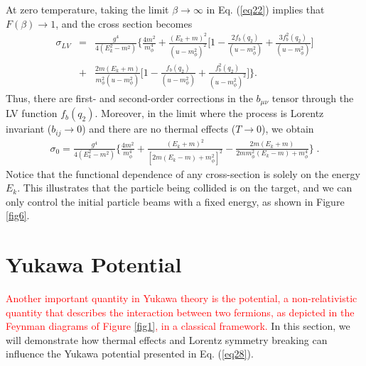 \documentclass[11pt,showpacs,preprintnumbers,amsmath,amssymb,prd,nofootinbib,superscriptaddress]{revtex4-2}
\begin{document}
At zero temperature, taking the limit $\beta \to \infty$ in Eq. (\ref{eq22}) implies that $F(\beta) \to 1$, and the cross section becomes
\begin{eqnarray}
\sigma_{LV}&=&\frac{g^4}{4(E_k^2-m^2)}\bigg\{\frac{4m^2}{m_\phi^4}+\frac{(E_k+m)^2}{(u-m_\phi^2)^2}\bigg[1-\frac{2f_b(q_2)}{(u-m_\phi^2)}+\frac{3f_b^2(q_2)}{(u-m_\phi^2)}\bigg]\nonumber\\
    &+&\frac{2m(E_k+m)}{m_{\phi}^2(u-m_\phi^2)}\bigg[1-\frac{f_b(q_2)}{(u-m_\phi^2)}+\frac{f^2_b(q_2)}{(u-m_\phi^2)^2}\bigg]\bigg\}.
\end{eqnarray}
Thus, there are first- and second-order corrections in the $b_{\mu \nu}$ tensor through the LV function $f_b(q_2)$. Moreover, in the limit where the process is Lorentz invariant ($b_{ij} \to 0$) and there are no thermal effects ($T \to 0$), we obtain
\begin{eqnarray}
    \sigma_{0}=\frac{g^4}{4(E_k^2-m^2)}\biggl\{\frac{4m^2}{m_\phi^4}+\frac{(E_k+m)^2}{[2m(E_k-m)+m_\phi^2]^2}-\frac{2m(E_k+m)}{2mm_\phi^2(E_k-m)+m_\phi^4}\biggr\}\;.
\end{eqnarray}
Notice that the functional dependence of any cross-section is solely on the energy $E_k$. This illustrates that the particle being collided is on the target, and we can only control the initial particle beams with a fixed energy, as shown in Figure \ref{fig6}.




\section{Yukawa Potential}\label{secpotential}

\textcolor{red}{Another important quantity in Yukawa theory is the potential, a non-relativistic quantity that describes the interaction between two fermions, as depicted in the Feynman diagrams of Figure \ref{fig1}, in a classical framework.} In this section, we will demonstrate how thermal effects and Lorentz symmetry breaking \textcolor{red}{\cite{altschul}} can influence the Yukawa potential presented in Eq. (\ref{eq28}).
\end{document}
